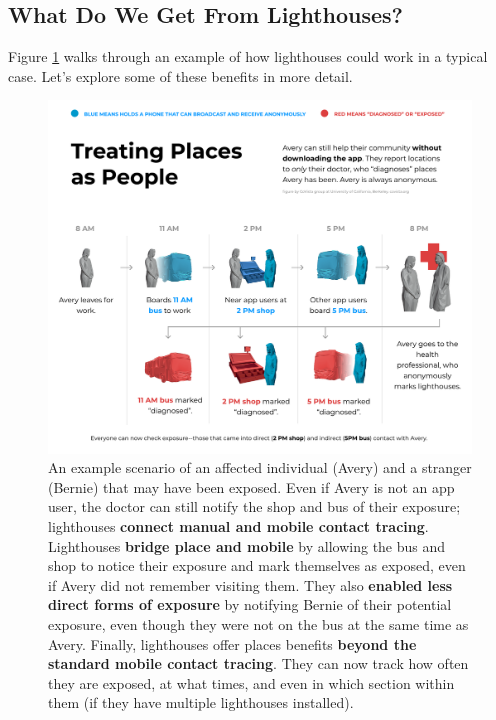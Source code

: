 \subsection{What Do We Get From Lighthouses?}
Figure \ref{fig:lighthouseExample} walks through an example of how lighthouses could work in a typical case. Let's explore some of these benefits in more detail.
\begin{figure}
    \centering
    \includegraphics[width=\textwidth]{figs/how_lighthouse_works.pdf}
    \caption{An example scenario of an affected individual (Avery) and a stranger (Bernie) that may have been exposed. Even if Avery is not an app user, the doctor can still notify the shop and bus of their exposure; lighthouses \textbf{connect manual and mobile contact tracing}. Lighthouses \textbf{bridge place and mobile} by allowing the bus and shop to notice their exposure and mark themselves as exposed, even if Avery did not remember visiting them. They also \textbf{enabled less direct forms of exposure} by notifying Bernie of their potential exposure, even though they were not on the bus at the same time as Avery. Finally, lighthouses offer places benefits \textbf{beyond the standard mobile contact tracing}. They can now track how often they are exposed, at what times, and even in which section within them (if they have multiple lighthouses installed).}
    \label{fig:lighthouseExample}
\end{figure}


